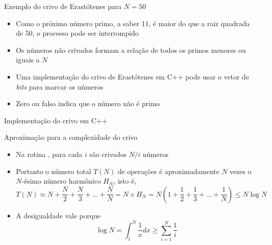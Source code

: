 

\begin{frame}[fragile]{Exemplo do crivo de Erastótenes para $N = 50$}

    \begin{itemize}
        \item Como o próximo número primo, a saber 11, é maior do que a raiz quadrada de 50, o 
            processo pode ser interrompido

        \item Os números não crivados formam a relação de todos os primos menores ou iguais a $N$

        \item Uma implementação do crivo de Erastótenes em C++ pode usar o vetor de \textit{bits} 
             para marcar os números

        \item Zero ou falso indica que o número não é primo
    \end{itemize}

\end{frame}

\begin{frame}[fragile]{Implementação do crivo em C++}
\end{frame}

\begin{frame}[fragile]{Aproximação para a complexidade do crivo}

    \begin{itemize}
        \item Na rotina , para cada $i$ são crivados $N/i$ números

        \item Portanto o número total $T(N)$ de operações é aproximadamente $N$ vezes o $N$-ésimo 
            número harmônico $H_N$, isto é,
$$
   T(N) \approx N + \frac{N}{2} + \frac{N}{3} + \ldots + \frac{N}{N} = N\times H_N =  N\left(1 + \frac{1}{2} + \frac{1}{3} + \ldots + \frac{1}{N}\right) \leq N \log N
$$

        \item A desigualdade vale porque 
$$
    \log N = \int_1^N \frac{1}{x} dx \geq \sum_{i = 1}^N  \frac{1}{i}
$$
    \end{itemize}

\end{frame}

